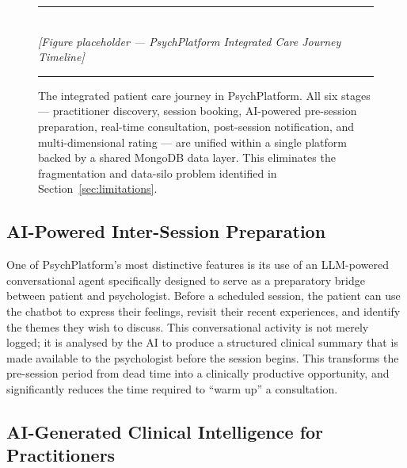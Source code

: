 \begin{figure}[H]
  \centering
  \rule{0.85\textwidth}{0.4pt}\\[6pt]
  {\small\itshape [Figure placeholder — PsychPlatform Integrated Care Journey Timeline]}
  \rule{0.85\textwidth}{0.4pt}
  \caption{The integrated patient care journey in PsychPlatform. All six stages
           — practitioner discovery, session booking, AI-powered pre-session
           preparation, real-time consultation, post-session notification, and
           multi-dimensional rating — are unified within a single platform backed
           by a shared MongoDB data layer. This eliminates the fragmentation
           and data-silo problem identified in Section~\ref{sec:limitations}.}
  \label{fig:care-journey}
\end{figure}

\subsection{AI-Powered Inter-Session Preparation}

One of PsychPlatform's most distinctive features is its use of an LLM-powered
conversational agent specifically designed to serve as a preparatory bridge
between patient and psychologist. Before a scheduled session, the patient can use
the chatbot to express their feelings, revisit their recent experiences, and
identify the themes they wish to discuss. This conversational activity is not
merely logged; it is analysed by the AI to produce a structured clinical summary
that is made available to the psychologist before the session begins. This
transforms the pre-session period from dead time into a clinically productive
opportunity, and significantly reduces the time required to ``warm up'' a
consultation.

\subsection{AI-Generated Clinical Intelligence for Practitioners}

